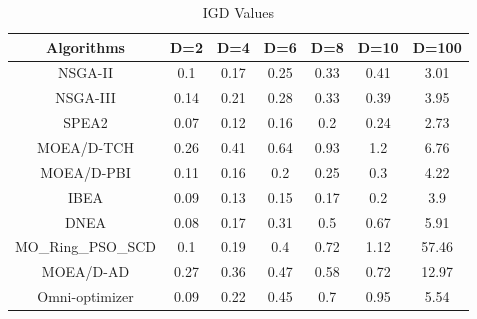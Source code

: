 \documentclass[conference]{IEEEtran}
\begin{document}
\begin{table}[t!]
\centering
\caption{IGD Values}
\begin{tabular}{@{}ccccccc@{}}
\toprule
Algorithms      & D=2                          & D=4                          & D=6                          & D=8                          & D=10                        & D=100                        \\ \midrule
NSGA-II         & 0.1                          & 0.17                         & 0.25                         & 0.33                         & 0.41                        & 3.01                         \\
NSGA-III        & 0.14                         & 0.21                         & 0.28                         & 0.33                         & 0.39                        & 3.95                         \\
SPEA2           & \cellcolor[HTML]{F8FF00}0.07 & \cellcolor[HTML]{F8FF00}0.12 & 0.16                         & 0.2                          & 0.24                        & \cellcolor[HTML]{F8FF00}2.73 \\
MOEA/D-TCH      & 0.26                         & 0.41                         & 0.64                         & 0.93                         & 1.2                         & 6.76                         \\
MOEA/D-PBI      & 0.11                         & 0.16                         & 0.2                          & 0.25                         & 0.3                         & 4.22                          \\
IBEA            & 0.09                         & 0.13                         & \cellcolor[HTML]{F8FF00}0.15 & \cellcolor[HTML]{F8FF00}0.17 & \cellcolor[HTML]{F8FF00}0.2 & 3.9                          \\
DNEA            & 0.08                         & 0.17                         & 0.31                         & 0.5                          & 0.67                        & 5.91                         \\
MO\_Ring\_PSO\_SCD & 0.1                          & 0.19                         & 0.4                          & 0.72                         & 1.12                        & 57.46                        \\
MOEA/D-AD       & 0.27                         & 0.36                         & 0.47                         & 0.58                         & 0.72                        & 12.97                        \\
Omni-optimizer  & 0.09                         & 0.22                          & 0.45                         & 0.7                          & 0.95                        & 5.54                         \\ \bottomrule
\end{tabular}
\label{table: IGD sumup}
\end{table}
\end{document}
